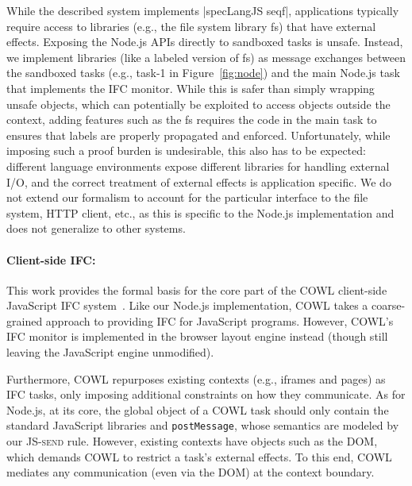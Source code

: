 While the described system implements |specLangJS seqf|, applications
typically require access to libraries (e.g., the file system library
\textsf{fs}) that have external effects.
%
Exposing the Node.js APIs directly to sandboxed tasks is unsafe.
Instead, we implement libraries (like a labeled version of \textsf{fs}) as
message exchanges between the sandboxed tasks (e.g., \textsf{task-1}
in Figure~\ref{fig:node}) and the main Node.js task that implements
the IFC monitor.
%
While this is safer than simply wrapping unsafe objects, which can
potentially be exploited to access objects outside the context, adding
features such as the \textsf{fs} requires the code in the main task to
ensures that labels are properly propagated and enforced.
%
Unfortunately, while imposing such a proof burden
is undesirable, this also has to be expected:
different language environments expose different libraries for
handling external I/O, and the correct treatment of external effects
is application specific.
%
%
%
We do not extend our formalism to account for the  particular
interface to the file system, HTTP client, etc., as this is
specific to the Node.js implementation and does not generalize
to other systems.


\paragraph{Client-side IFC:}
This work provides the formal basis for the core part of the COWL
client-side JavaScript IFC system~\cite{swapi}.
%
Like our Node.js implementation, COWL takes a coarse-grained approach
to providing IFC for JavaScript programs.
%
However, COWL's IFC monitor is implemented in
the browser layout engine instead (though still leaving the JavaScript engine
unmodified).

Furthermore, COWL repurposes existing contexts (e.g., iframes and
pages) as IFC tasks, only imposing additional constraints on how they
communicate.
%
As for Node.js, at its core, the global object of a COWL task
should only contain the standard JavaScript libraries and
\texttt{postMessage}, whose semantics are modeled by our
\textsc{JS-send} rule.
%
However, existing contexts have objects such as the DOM, which
demands COWL to restrict a task's external effects.
%
To this end, COWL mediates any communication (even via the DOM) at
the context boundary. %

